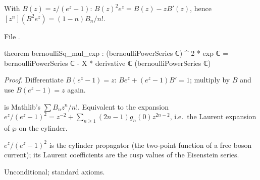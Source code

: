 \begin{theorem}\label{l14:thm:bernsq}
With $B(z) = z/(e^z-1)$: $B(z)^2e^z = B(z) - zB'(z)$, hence $[z^n](B^2e^z) = (1-n)B_n/n!$.
\end{theorem}
\noindent File .
\begin{leancode}
theorem bernoulliSq_mul_exp :
    (bernoulliPowerSeries ℂ) ^ 2 * exp ℂ
      = bernoulliPowerSeries ℂ - X * derivative ℂ (bernoulliPowerSeries ℂ)
\end{leancode}
\noindent\emph{Proof.} Differentiate $B(e^z-1) = z$: $Be^z + (e^z-1)B' = 1$; multiply by $B$ and use $B(e^z-1) = z$ again.
\begin{dictionary}
 is Mathlib's $\sum B_nz^n/n!$. Equivalent to the expansion $e^z/(e^z-1)^2 =
z^{-2} + \sum_{n\ge1}(2n-1)g_n(0)z^{2n-2}$, i.e.\ the Laurent expansion of $\wp$ on the cylinder.
\end{dictionary}
\begin{physics}
$e^z/(e^z-1)^2$ is the cylinder propagator (the two-point function of a free boson current); its Laurent coefficients are the
cusp values of the Eisenstein series.
\end{physics}
\begin{status}
Unconditional; standard axioms.
\end{status}

